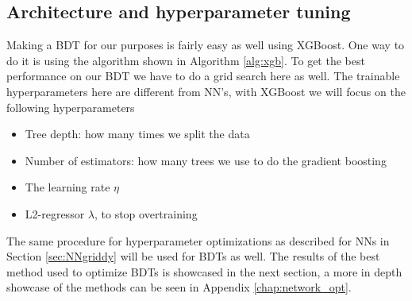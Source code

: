 \documentclass[12pt, a4paper]{book}
\begin{document}
\subsection{Architecture and hyperparameter tuning}\label{sec:BDTGriddy}
Making a BDT for our purposes is fairly easy as well using XGBoost. One way to do it is using the algorithm shown in Algorithm \ref{alg:xgb}. 
To get the best performance on our BDT we have to do a grid search here as well. The trainable hyperparameters here are different from NN's, with XGBoost we will focus on the following hyperparameters
\begin{itemize}
   \item Tree depth: how many times we split the data
   \item Number of estimators: how many trees we use to do the gradient boosting
   \item The learning rate $\eta$
   \item L2-regressor $\lambda$, to stop overtraining
\end{itemize}
The same procedure for hyperparameter optimizations as described for NNs in Section \ref{sec:NNgriddy} will be used for BDTs as well. The results of the best method used to optimize BDTs is showcased in the next section, a more in depth showcase of the methods can be seen in Appendix \ref{chap:network_opt}. 

\newpage
\end{document}

